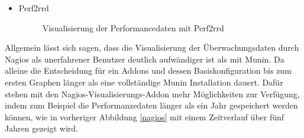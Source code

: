 \begin{itemize}
\item Perf2rrd

\begin{figure}[ht]
	\centering
		\caption{Visualisierung der Performancedaten mit Perf2rrd}
		\label{perf2rdd}
\end{figure}
\end{itemize}

Allgemein lässt sich sagen, dass die Visualisierung der Überwachungsdaten durch Nagios als unerfahrener Benutzer deutlich aufwändiger ist als mit Munin.
Da alleine die Entscheidung für ein Addons und dessen Basiskonfiguration bis zum ersten Graphen länger als eine vollständige Munin Installation dauert.
Dafür stehen mit den Nagios-Visualisierungs-Addon mehr Möglichkeiten zur Verfügung, indem zum Beispiel die Performanzedaten länger als ein Jahr gespeichert werden können, wie in vorheriger Abbildung \ref{nagios} mit einem Zeitverlauf über fünf Jahren gezeigt wird.

